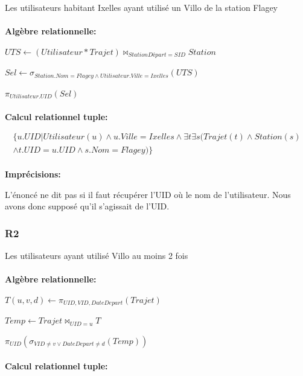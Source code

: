 \documentclass[a4paper, 12pt]{report}
\begin{document}
Les utilisateurs habitant Ixelles ayant utilisé un Villo de la station Flagey
\paragraph{}
\textbf{Algèbre relationnelle:}

$UTS\leftarrow (Utilisateur * Trajet)\bowtie_{StationDépart=SID} Station$

$Sel\leftarrow \sigma_{Station.Nom=Flagey\wedge Utilisateur.Ville=Ixelles}(UTS)$

$\pi_{Utilisateur.UID}(Sel)$
\paragraph{}
\paragraph{}
\textbf{Calcul relationnel tuple:}

\begin{multline*}
\{  u.UID | Utilisateur(u)\wedge u.Ville=Ixelles \wedge \exists t \exists s ( Trajet(t)\wedge Station(s) \\\wedge t.UID=u.UID \wedge s.Nom=Flagey)   \} 
\end{multline*}

\paragraph{}
\textbf{Imprécisions:}

L'énoncé ne dit pas si il faut récupérer l'UID où le nom de l'utilisateur. Nous avons donc supposé qu'il s'agissait de l'UID.

\subsubsection*{R2}

Les utilisateurs ayant utilisé Villo au moins 2 fois
\paragraph{}
\textbf{Algèbre relationnelle:}

$T(u,v,d) \leftarrow\pi_{UID,VID,DateDepart}(Trajet)$

$Temp\leftarrow Trajet\bowtie_{UID=u}T $

$\pi_{UID}( \sigma_{VID\neq v\vee DateDepart\neq d}(Temp)  )$

\paragraph{}
\textbf{Calcul relationnel tuple:}
\end{document}
